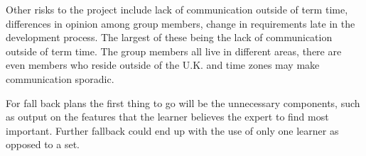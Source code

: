 \documentclass{ecmm427_assignment}
\begin{document}
 Other risks to the project include lack of communication outside of term time, differences in opinion among group members, change in requirements late in the development process. The largest of these being the lack of communication outside of term time. The group members all live in different areas, there are even members who reside outside of the U.K. and time zones may make communication sporadic. 

 For fall back plans the first thing to go will be the unnecessary components, such as output on the features that the learner believes the expert to find most important. Further fallback could end up with the use of only one learner as opposed to a set.


\end{document}
